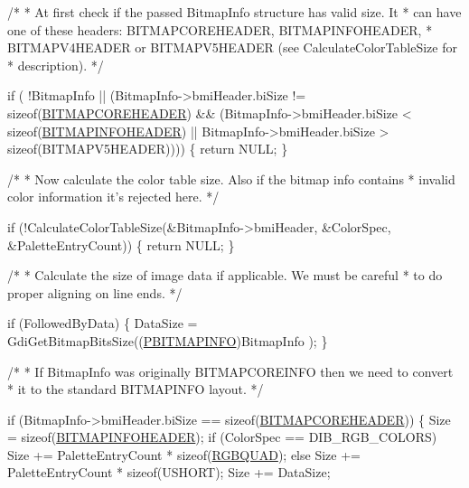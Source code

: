 \begin{DoxyCodeInclude}
    \textcolor{comment}{/*}
\textcolor{comment}{     * At first check if the passed BitmapInfo structure has valid size. It}
\textcolor{comment}{     * can have one of these headers: BITMAPCOREHEADER, BITMAPINFOHEADER,}
\textcolor{comment}{     * BITMAPV4HEADER or BITMAPV5HEADER (see CalculateColorTableSize for}
\textcolor{comment}{     * description).}
\textcolor{comment}{     */}

    \textcolor{keywordflow}{if} ( !BitmapInfo ||
            (BitmapInfo->bmiHeader.biSize != \textcolor{keyword}{sizeof}(\hyperlink{structtag_b_i_t_m_a_p_c_o_r_e_h_e_a_d_e_r}{BITMAPCOREHEADER}) &&
             (BitmapInfo->bmiHeader.biSize < \textcolor{keyword}{sizeof}(\hyperlink{struct_b_i_t_m_a_p_i_n_f_o_h_e_a_d_e_r}{BITMAPINFOHEADER}) ||
              BitmapInfo->bmiHeader.biSize > \textcolor{keyword}{sizeof}(BITMAPV5HEADER))))
    \{
        \textcolor{keywordflow}{return} NULL;
    \}

    \textcolor{comment}{/*}
\textcolor{comment}{     * Now calculate the color table size. Also if the bitmap info contains}
\textcolor{comment}{     * invalid color information it's rejected here.}
\textcolor{comment}{     */}

    \textcolor{keywordflow}{if} (!CalculateColorTableSize(&BitmapInfo->bmiHeader, &ColorSpec,
                                 &PaletteEntryCount))
    \{
        \textcolor{keywordflow}{return} NULL;
    \}

    \textcolor{comment}{/*}
\textcolor{comment}{     * Calculate the size of image data if applicable. We must be careful}
\textcolor{comment}{     * to do proper aligning on line ends.}
\textcolor{comment}{     */}

    \textcolor{keywordflow}{if} (FollowedByData)
    \{
        DataSize = GdiGetBitmapBitsSize((\hyperlink{structtag_b_i_t_m_a_p_i_n_f_o}{PBITMAPINFO})BitmapInfo );
    \}

    \textcolor{comment}{/*}
\textcolor{comment}{     * If BitmapInfo was originally BITMAPCOREINFO then we need to convert}
\textcolor{comment}{     * it to the standard BITMAPINFO layout.}
\textcolor{comment}{     */}

    \textcolor{keywordflow}{if} (BitmapInfo->bmiHeader.biSize == \textcolor{keyword}{sizeof}(\hyperlink{structtag_b_i_t_m_a_p_c_o_r_e_h_e_a_d_e_r}{BITMAPCOREHEADER}))
    \{
        Size = \textcolor{keyword}{sizeof}(\hyperlink{struct_b_i_t_m_a_p_i_n_f_o_h_e_a_d_e_r}{BITMAPINFOHEADER});
        \textcolor{keywordflow}{if} (ColorSpec == DIB\_RGB\_COLORS)
            Size += PaletteEntryCount * \textcolor{keyword}{sizeof}(\hyperlink{structtag_r_g_b_q_u_a_d}{RGBQUAD});
        \textcolor{keywordflow}{else}
            Size += PaletteEntryCount * \textcolor{keyword}{sizeof}(USHORT);
        Size += DataSize;


\end{DoxyCodeInclude}
